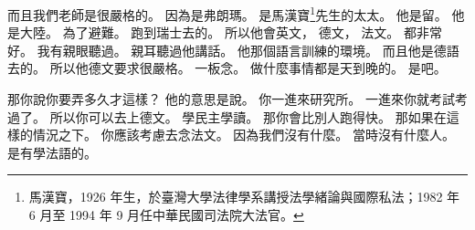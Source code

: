 \hypertarget{w01:cue:4038}{}而且我們老師是很嚴格的。
\hypertarget{w01:cue:4039}{}因為是弗朗瑪。
\hypertarget{w01:cue:4040}{}是馬漢寶\footnote{馬漢寶，1926 年生，於臺灣大學法律學系講授法學緒論與國際私法；1982 年 6 月至 1994 年 9 月任中華民國司法院大法官。}先生的太太。
\hypertarget{w01:cue:4041}{}他是留。
\hypertarget{w01:cue:4042}{}他是大陸。
\hypertarget{w01:cue:4043}{}為了避難。
\hypertarget{w01:cue:4044}{}跑到瑞士去的。
\hypertarget{w01:cue:4045}{}所以他會英文，
\hypertarget{w01:cue:4046}{}德文，
\hypertarget{w01:cue:4047}{}法文。
\hypertarget{w01:cue:4048}{}都非常好。
\hypertarget{w01:cue:4049}{}我有親眼聽過。
\hypertarget{w01:cue:4050}{}親耳聽過他講話。
\hypertarget{w01:cue:4051}{}他那個語言訓練的環境。
\hypertarget{w01:cue:4052}{}而且他是德語去的。
\hypertarget{w01:cue:4053}{}所以他德文要求很嚴格。
\hypertarget{w01:cue:4054}{}一板念。
\hypertarget{w01:cue:4055}{}做什麼事情都是天到晚的。
\hypertarget{w01:cue:4056}{}是吧。

\hypertarget{w01:cue:4057}{}那你說你要弄多久才這樣？
\hypertarget{w01:cue:4058}{}他的意思是說。
\hypertarget{w01:cue:4059}{}你一進來研究所。
\hypertarget{w01:cue:4060}{}一進來你就考試考過了。
\hypertarget{w01:cue:4061}{}所以你可以去上德文。
\hypertarget{w01:cue:4062}{}學民主學讀。
\hypertarget{w01:cue:4063}{}那你會比別人跑得快。
\hypertarget{w01:cue:4064}{}那如果在這樣的情況之下。
\hypertarget{w01:cue:4065}{}你應該考慮去念法文。
\hypertarget{w01:cue:4066}{}因為我們沒有什麼。
\hypertarget{w01:cue:4067}{}當時沒有什麼人。
\hypertarget{w01:cue:4068}{}是有學法語的。


